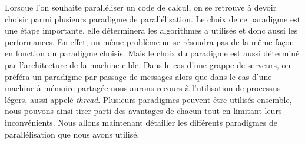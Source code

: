 Lorsque l'on souhaite paralléliser un code de calcul, on se retrouve à devoir choisir parmi plusieurs paradigme de parallélisation.
%
Le choix de ce paradigme est une étape importante, elle déterminera les algorithmes a utilisés et donc aussi les performances.
%
En effet, un même problème ne se résoudra pas de la même façon en fonction du paradigme choisis.
%
Mais le choix du paradigme est aussi déterminé par l'architecture de la machine cible.
%
Dans le cas d'une grappe de serveurs, on préféra un paradigme par passage de messages alors que dans le cas d'une machine à mémoire partagée nous aurons recours à l'utilisation de processus légers, aussi appelé {\em thread}.
%
Plusieurs paradigmes peuvent être utilisés ensemble, nous pouvons ainsi tirer parti des avantages de chacun tout en limitant leurs inconvénients.
%
Nous allons maintenant détailler les différents paradigmes de parallélisation que nous avons utilisé.

